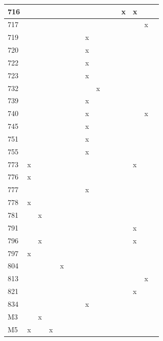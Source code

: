 \begin{landscape}
\begin{longtable}{|p{0.2in}|p{0.3in}|p{0.41in}|p{0.4in}|p{0.3in}|p{0.31in}|p{0.3in}|p{0.3in}|p{0.375in}|p{0.3in}|p{0.3in}|p{0.35in}|p{0.35in}|p{0.4in}|p{0.3in}|}
   716 &  &  &  &  &  &  &  &  &  &  & x & x &  &  \\  \hline
   717 &  &  &  &  &  &  &  &  &  &  &  &  & x &  \\  \hline
   719 &  &  &  &  &  &  & x &  &  &  &  &  &  &  \\  \hline
   720 &  &  &  &  &  &  & x &  &  &  &  &  &  &  \\  \hline
   722 &  &  &  &  &  &  & x &  &  &  &  &  &  &  \\  \hline
   723 &  &  &  &  &  &  & x &  &  &  &  &  &  &  \\  \hline
   732 &  &  &  &  &  &  &  & x &  &  &  &  &  &  \\  \hline
    739 &  &  &  &  &  &  & x &  &  &  &  &  &  &   \\  \hline
    740 &  &  &  &  &  &  & x &  &  &  &  &  & x &  \\  \hline
    745 &  &  &  &  &  &  & x &  &  &  &  &  &  &  \\  \hline
    751 &  &  &  &  &  &  & x &  &  &  &  &  &  &  \\  \hline
    755 &  &  &  &  &  &  & x &  &  &  &  &  &  &   \\  \hline
    773 & x &  &  &  &  &  &  &  &  &  &  & x &  &  \\  \hline
    776 & x &  &  &  &  &  &  &  &  &  &  &  &  &  \\  \hline
    777 &  &  &  &  &  &  & x &  &  &  &  &  &  &  \\  \hline
    778 & x &  &  &  &  &  &  &  &  &  &  &  &  &   \\  \hline
  781 &  & x &  &  &  &  &  &  &  &  &  &  &  &  \\ \hline
  791 &  &  &  &  &  &  &  &  &  &  &  & x &  &  \\ \hline
  796 &  & x &  &  &  &  &  &   &   &   &  & x &  &   \\  \hline
    797 & x &  &  &  &  &  &  &  &  &  &  &  &  &  \\  \hline
    804 &  &  &  & x &  &  &  &  &  &  &  &  &  &  \\  \hline
    813 &  &  &  &  &  &  &  &  &  &  &  &  & x &  \\  \hline
    821 &  &  &  &  &  &  &  &  &  &  &  & x &  &  \\  \hline
    834 &  &  &  &  &  &  & x &  &  &  &  &  &  &  \\  \hline
    M3 &  & x &  &  &  &  &  &  &  &  &  &  &  &  \\  \hline
    M5 & x &  & x &  &  &  &  &  &  &  &  &  &  &  \\  \hline

\end{longtable}
\end{landscape}
